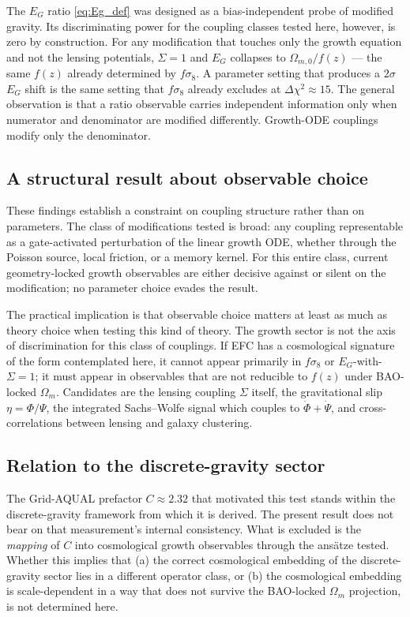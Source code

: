 \documentclass[11pt,a4paper]{article}
\begin{document}
The $E_G$ ratio \eqref{eq:Eg_def} was designed as a bias-independent probe of modified gravity. Its discriminating power for the coupling classes tested here, however, is zero by construction. For any modification that touches only the growth equation and not the lensing potentials, $\Sigma = 1$ and $E_G$ collapses to $\Omega_{m,0}/f(z)$ --- the same $f(z)$ already determined by $f\sigma_8$. A parameter setting that produces a $2\sigma$ $E_G$ shift is the same setting that $f\sigma_8$ already excludes at $\Delta\chi^2 \approx 15$. The general observation is that a ratio observable carries independent information only when numerator and denominator are modified differently. Growth-ODE couplings modify only the denominator.

\subsection{A structural result about observable choice}

These findings establish a constraint on coupling structure rather than on parameters. The class of modifications tested is broad: any coupling representable as a gate-activated perturbation of the linear growth ODE, whether through the Poisson source, local friction, or a memory kernel. For this entire class, current geometry-locked growth observables are either decisive against or silent on the modification; no parameter choice evades the result.

The practical implication is that observable choice matters at least as much as theory choice when testing this kind of theory. The growth sector is not the axis of discrimination for this class of couplings. If EFC has a cosmological signature of the form contemplated here, it cannot appear primarily in $f\sigma_8$ or $E_G$-with-$\Sigma=1$; it must appear in observables that are not reducible to $f(z)$ under BAO-locked $\Omega_m$. Candidates are the lensing coupling $\Sigma$ itself, the gravitational slip $\eta = \Phi/\Psi$, the integrated Sachs--Wolfe signal which couples to $\dot\Phi + \dot\Psi$, and cross-correlations between lensing and galaxy clustering.

\subsection{Relation to the discrete-gravity sector}

The Grid-AQUAL prefactor $C \approx 2.32$ that motivated this test stands within the discrete-gravity framework from which it is derived. The present result does not bear on that measurement's internal consistency. What is excluded is the \emph{mapping} of $C$ into cosmological growth observables through the ansätze tested. Whether this implies that (a) the correct cosmological embedding of the discrete-gravity sector lies in a different operator class, or (b) the cosmological embedding is scale-dependent in a way that does not survive the BAO-locked $\Omega_m$ projection, is not determined here.
\end{document}
